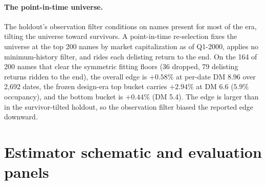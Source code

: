 \documentclass[11pt]{article}
\begin{document}
\paragraph{The point-in-time universe.} The holdout's observation filter conditions on names present for most of the era, tilting the universe toward survivors. A point-in-time re-selection fixes the universe at the top 200 names by market capitalization as of Q1-2000, applies no minimum-history filter, and rides each delisting return to the end. On the 164 of 200 names that clear the symmetric fitting floors (36 dropped, 79 delisting returns ridden to the end), the overall edge is $+0.58\%$ at per-date DM 8.96 over 2{,}692 dates, the frozen design-era top bucket carries $+2.94\%$ at DM 6.6 ($5.9\%$ occupancy), and the bottom bucket is $+0.44\%$ (DM 5.4). The edge is larger than in the survivor-tilted holdout, so the observation filter biased the reported edge downward.

\section{Estimator schematic and evaluation panels}
\end{document}
